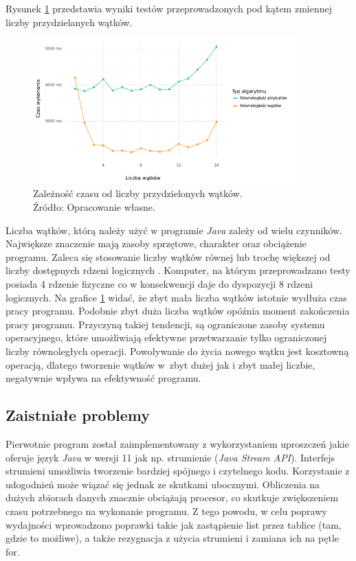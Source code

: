 \documentclass[12pt]{article}
\begin{document}
Rysunek \ref{fig:analysis-threads} przedstawia wyniki testów przeprowadzonych pod kątem zmiennej
liczby przydzielanych wątków.

\begin{figure}[H]
    \centering
	\includegraphics[width=0.9\textwidth]{analysis-threads.pdf}
    \caption{Zależność czasu od liczby przydzielonych wątków.\\Źródło: Opracowanie własne.}
    \label{fig:analysis-threads}
\end{figure}

Liczba wątków, którą należy użyć w programie \textit{Java} zależy od wielu czynników. Największe znaczenie
mają zasoby sprzętowe, charakter oraz obciążenie programu.
Zaleca się stosowanie liczby wątków równej lub trochę większej od liczby dostępnych rdzeni logicznych \cite{java-threads}.
Komputer, na którym przeprowadzano testy posiada 4 rdzenie fizyczne co w konsekwencji daje do
dyspozycji 8 rdzeni logicznych. Na grafice \ref{fig:analysis-threads} widać, że
zbyt mała liczba wątków istotnie wydłuża czas pracy programu.
Podobnie zbyt duża liczba wątków opóźnia moment zakończenia pracy programu. Przyczyną takiej tendencji, 
są ograniczone zasoby systemu operacyjnego, które umożliwiają
efektywne przetwarzanie tylko ograniczonej liczby równoległych operacji. Powoływanie do życia nowego wątku
jest kosztowną operacją, dlatego tworzenie wątków w~zbyt dużej jak i zbyt małej liczbie, negatywnie wpływa
na efektywność programu.

\subsection{Zaistniałe problemy}
Pierwotnie program został zaimplementowany z wykorzystaniem uproszczeń jakie oferuje język \textit{Java} w wersji 11
jak np. strumienie (\textit{Java Stream API}). Interfejs strumieni umożliwia tworzenie
bardziej spójnego i czytelnego kodu. Korzystanie z udogodnień może wiązać się jednak ze skutkami ubocznymi.
Obliczenia na dużych zbiorach danych znacznie obciążają procesor, co skutkuje zwiększeniem czasu
potrzebnego na wykonanie programu. Z tego powodu, w celu poprawy wydajności wprowadzono poprawki
takie jak zastąpienie list przez tablice (tam, gdzie to możliwe), a także rezygnacja
z użycia strumieni i zamiana ich na pętle for.
\end{document}
